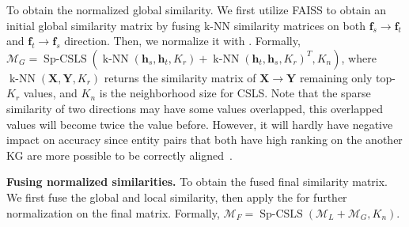 To obtain the normalized global similarity. We first utilize FAISS to obtain an initial global similarity matrix by fusing k-NN similarity matrices on both $\mathbf{f}_s \rightarrow \mathbf{f}_t$ and $\mathbf{f}_t \rightarrow \mathbf{f}_s$ direction. Then, we normalize it with \SparseCSLS{}. Formally, $\mathcal{M}_{G} = \operatorname{Sp-CSLS}(\operatorname{k-NN}(\mathbf{h}_s, \mathbf{h}_t,K_r) + \operatorname{k-NN}(\mathbf{h}_t, \mathbf{h}_s,K_r)^T, K_n)$, where $\operatorname{k-NN}(\mathbf{X}, \mathbf{Y},K_r)$ returns the similarity matrix of $\mathbf{X} \rightarrow \mathbf{Y}$ remaining only top-$K_r$ values, and $K_n$ is the neighborhood size for CSLS. Note that the sparse similarity of two directions may have some values overlapped, this overlapped values will become twice the value before. However, it will hardly have negative impact on accuracy since entity pairs that both have high ranking on the another KG are more possible to be correctly aligned~\cite{MRAEA20}. 

\noindent
\textbf{Fusing normalized similarities.}
To obtain the fused final similarity matrix. We first fuse the global and local similarity, then apply the \SparseCSLS{} for further normalization on the final matrix. Formally, $\mathcal{M}_{F}=\operatorname{Sp-CSLS}( \mathcal{M}_L +\mathcal{M}_G, K_n)$. 








